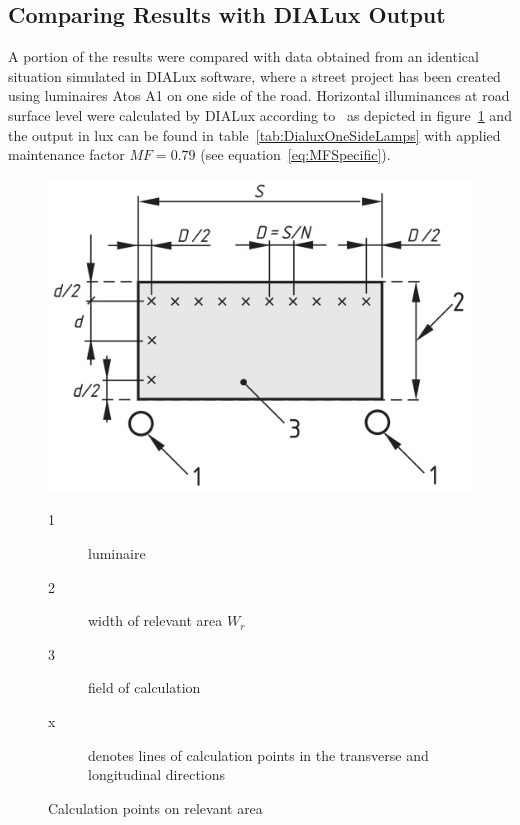 \subsection{Comparing Results with DIALux Output}

A portion of the results were compared with data obtained from an identical situation simulated in DIALux software, where a street project has been created using luminaires Atos A1 on one side of the road. Horizontal illuminances at road surface level were calculated by DIALux according to~\cite{CSN_EN_13201-3} as depicted in figure~\ref{fig:Standard13210-3} and the output in lux can be found in table~\ref{tab:DialuxOneSideLamps} with applied maintenance factor $MF=0.79$ (see equation~\ref{eq:MFSpecific}).

\begin{figure}[htb]
  \centering
  \includegraphics[width=0.8\columnwidth]{13201-3_points}
	\begin{description}
		\item[1] luminaire
		\item[2] width of relevant area $W_{r}$
		\item[3] field of calculation
		\item[x] denotes lines of calculation points in the transverse and longitudinal directions
	\end{description}
	\caption{Calculation points on relevant area \cite{CSN_EN_13201-3}}
  \label{fig:Standard13210-3}
\end{figure}

